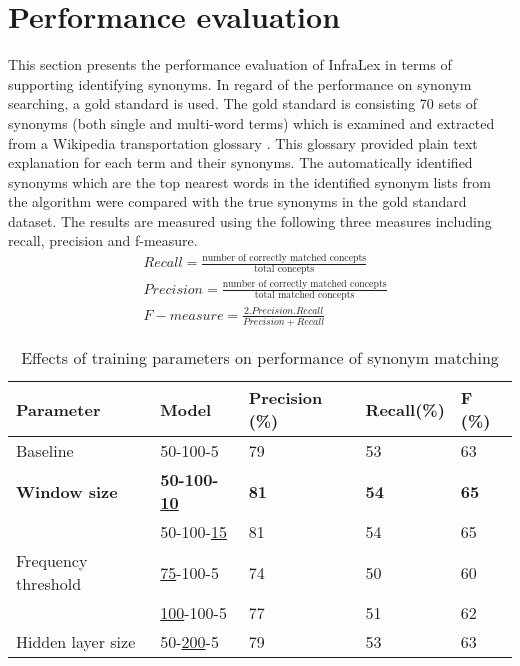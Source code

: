 \documentclass[Journal, InsideFigs, DoubleSpace]{ascelike} %
\begin{document}
\section{Performance evaluation} \label{sec:eval}
This section presents the performance evaluation of InfraLex in terms of supporting identifying synonyms. In regard of the performance on synonym searching, a gold standard  is used. The gold standard is consisting 70 sets of synonyms (both single and multi-word terms) which is examined and extracted from a Wikipedia transportation glossary \cite{wikipedia16}. This glossary provided plain text explanation for each term and their synonyms. The automatically identified synonyms which are the top nearest words in the identified synonym lists from the algorithm were compared with the true synonyms in the gold standard dataset. The results are measured using the following three measures including recall, precision and f-measure.
%
\begin{align} 
&Recall = \frac{\text{number of correctly matched concepts}}{\text{total concepts}}  \\ 
&Precision = \frac{\text{number of correctly matched concepts}}{\text{total matched concepts}}  \\
&F-measure = \frac{2.Precision.Recall}{Precision+Recall}
\end{align}
\begin{table} [b] 
	\caption{Effects of training parameters on performance of synonym matching}
	\label{table:eval_syn_par_effect}
	\centering
	\small
	\renewcommand{\arraystretch}{1.25}
	\begin{tabular}{l l l l l }
		\hline
		\hline
		\textbf{Parameter} & \textbf{Model} & \textbf{Precision (\%)}  & \textbf{Recall(\%)} & \textbf{F (\%)}\\
		\hline
		Baseline	&	50-100-5	&79		&53		&63\\
		\hline
		\textbf{Window size}	&\textbf{50-100-\underline{10}}	&\textbf{81}		&\textbf{54}		&\textbf{65}\\
					&50-100-\underline{15}	&81		&54		&65\\
		\hline		
		Frequency threshold	&\underline{75}-100-5	&74		&50		&60\\
							&\underline{100}-100-5	&77		&51		&62\\
		\hline
		Hidden layer size	&50-\underline{200}-5	&79		&53		&63\\
		\hline
		\hline
	\end{tabular}
	\normalsize
\end{table}
\end{document}
